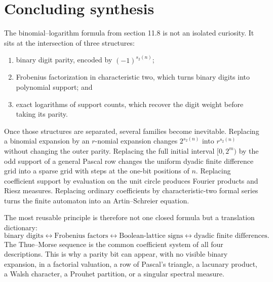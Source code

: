 \documentclass[11pt,oneside]{article}
\theoremstyle{definition}
\theoremstyle{remark}
\newcommand{\swt}{s_2}
\newcommand{\1}{\mathbf 1}
\begin{document}
\section{Concluding synthesis}
\label{sec:conclusion}

The binomial--logarithm formula from section 11.8 is not an isolated curiosity.  It sits at the
intersection of three structures:

\begin{enumerate}
\item binary digit parity, encoded by \((-1)^{\swt(n)}\);
\item Frobenius factorization in characteristic two, which turns binary digits into polynomial
      support; and
\item exact logarithms of support counts, which recover the digit weight before taking its
      parity.
\end{enumerate}

Once those structures are separated, several families become inevitable.  Replacing a
binomial expansion by an \(r\)-nomial expansion changes \(2^{\swt(n)}\) into
\(r^{\swt(n)}\) without changing the outer parity.  Replacing the full initial interval
\([0,2^m)\) by the odd support of a general Pascal row changes the uniform dyadic finite
difference grid into a sparse grid with steps at the one-bit positions of \(n\).  Replacing
coefficient support by evaluation on the unit circle produces Fourier products and Riesz
measures.  Replacing ordinary coefficients by characteristic-two formal series turns the
finite automaton into an Artin--Schreier equation.

The most reusable principle is therefore not one closed formula but a translation dictionary:
\[
 \boxed{
 \text{binary digits}
 \longleftrightarrow
 \text{Frobenius factors}
 \longleftrightarrow
 \text{Boolean-lattice signs}
 \longleftrightarrow
 \text{dyadic finite differences}.}
\]
The Thue--Morse sequence is the common coefficient system of all four descriptions.  This is
why a parity bit can appear, with no visible binary expansion, in a factorial valuation, a row
of Pascal's triangle, a lacunary product, a Walsh character, a Prouhet partition, or a
singular spectral measure.
\end{document}

